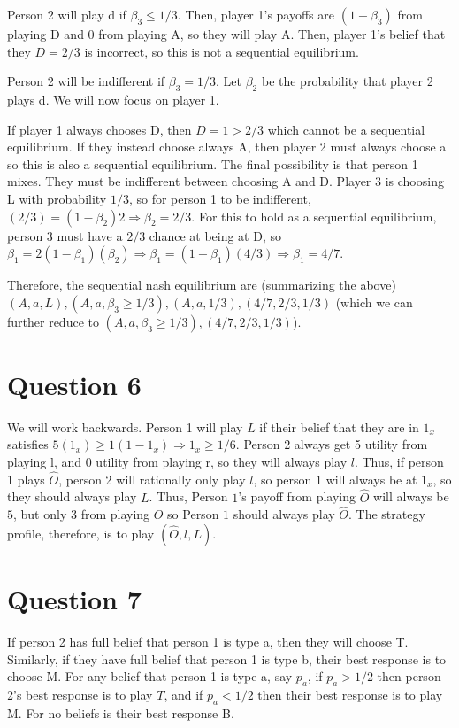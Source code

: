\documentclass[11pt]{article} %
\begin{document}
Person 2 will play d if $\beta_3\leq 1/3.$ Then, player 1's payoffs are $(1-\beta_3)$ from playing D and 0 from playing A, so they will play A. Then, player 1's belief that they $D=2/3$ is incorrect, so this is not a sequential equilibrium.

Person 2 will be indifferent if $\beta_3 = 1/3$. Let $\beta_2$ be the probability that player 2 plays d. We will now focus on player 1.

If player 1 always chooses D, then $D=1>2/3$ which cannot be a sequential equilibrium. If they instead choose always A, then player 2 must always choose a so this is also a sequential equilibrium. The final possibility is that person 1 mixes. They must be indifferent between choosing A and D. Player 3 is choosing L with probability $1/3$, so for person 1 to be indifferent, $(2/3) =  (1-\beta_2)2 \Rightarrow \beta_2 = 2/3$. For this to hold as a sequential equilibrium, person 3 must have a $2/3$ chance at being at D, so $\beta_1 = 2(1-\beta_1)(\beta_2) \Rightarrow \beta_1 = (1-\beta_1)(4/3) \Rightarrow \beta_1 = 4/7.$

Therefore, the sequential nash equilibrium are (summarizing the above) $(A,a,L),(A,a,\beta_3\geq1/3),(A,a,1/3),(4/7,2/3,1/3)$ (which we can further reduce to $(A,a,\beta_3\geq1/3),(4/7,2/3,1/3)$).
\section{Question 6}
We will work backwards. Person 1 will play $L$ if their belief that they are in $1_x$ satisfies $5(1_x) \geq 1(1-1_x) \Rightarrow 1_x \geq 1/6$. Person 2 always get 5 utility from playing l, and 0 utility from playing r, so they will always play $l$. Thus, if person 1 plays $\hat{O}$, person 2 will rationally only play $l$, so person $1$  will always be at $1_x$, so they should always play $L$. Thus, Person $1$'s payoff from playing $\hat{O}$ will always be $5$, but only $3$ from playing $O$ so Person $1$ should always play $\hat{O}$. The strategy profile, therefore, is to play $(\hat{O},l,L)$.
\section{Question 7}
If person 2 has full belief that person 1 is type a, then they will choose T. Similarly, if they have full belief that person 1 is type b, their best response is to choose M. For any belief that person 1 is type a, say $p_a$, if $p_a> 1/2$ then person 2's best response is to play $T$, and if $p_a<1/2$ then their best response is to play M. For no beliefs is their best response B.
\end{document}
